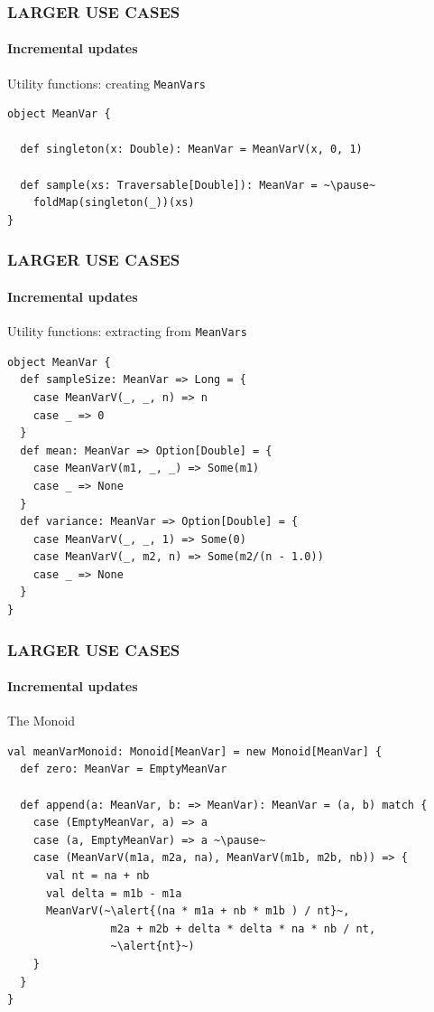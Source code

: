 \documentclass{beamer}
\begin{document}
\begin{frame}[fragile] \frametitle{LARGER USE CASES}
  \framesubtitle{Incremental updates}
  \begin{block}{Utility functions: creating \texttt{MeanVars}}
  \begin{lstlisting}
object MeanVar {

  def singleton(x: Double): MeanVar = MeanVarV(x, 0, 1)

  def sample(xs: Traversable[Double]): MeanVar = ~\pause~
    foldMap(singleton(_))(xs)
}
  \end{lstlisting}
  \end{block}
\end{frame}

\begin{frame}[fragile] \frametitle{LARGER USE CASES}
  \framesubtitle{Incremental updates}
  \begin{block}{Utility functions: extracting from \texttt{MeanVars}}
  \begin{lstlisting}
object MeanVar {
  def sampleSize: MeanVar => Long = {
    case MeanVarV(_, _, n) => n
    case _ => 0
  }
  def mean: MeanVar => Option[Double] = {
    case MeanVarV(m1, _, _) => Some(m1)
    case _ => None
  }
  def variance: MeanVar => Option[Double] = {
    case MeanVarV(_, _, 1) => Some(0)
    case MeanVarV(_, m2, n) => Some(m2/(n - 1.0))
    case _ => None
  }
}
  \end{lstlisting}
  \end{block}
\end{frame}

\begin{frame}[fragile] \frametitle{LARGER USE CASES}
  \framesubtitle{Incremental updates}
  \begin{block}{The Monoid}
  \begin{lstlisting}
val meanVarMonoid: Monoid[MeanVar] = new Monoid[MeanVar] {
  def zero: MeanVar = EmptyMeanVar

  def append(a: MeanVar, b: => MeanVar): MeanVar = (a, b) match {
    case (EmptyMeanVar, a) => a
    case (a, EmptyMeanVar) => a ~\pause~
    case (MeanVarV(m1a, m2a, na), MeanVarV(m1b, m2b, nb)) => {
      val nt = na + nb
      val delta = m1b - m1a
      MeanVarV(~\alert{(na * m1a + nb * m1b ) / nt}~,
                m2a + m2b + delta * delta * na * nb / nt,
                ~\alert{nt}~)
    }
  }
}
  \end{lstlisting}
  \end{block}
\end{frame}
\end{document}
